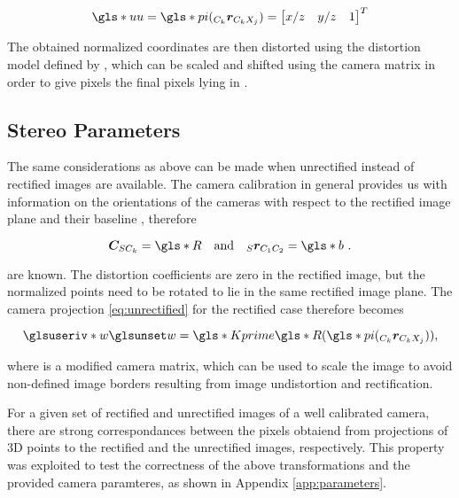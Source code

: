 \begin{equation}
  \g{uu} = \g{pi}(\crcx) = \rowvector{x/z & y/z & 1}^T
\end{equation}

The obtained normalized coordinates  are then distorted using the distortion model  defined by
\cite{radtan}, which can be scaled and shifted using the camera matrix  in order to
give pixels the final pixels  lying in .

\subsection{Stereo Parameters}

The same considerations as above can be made when unrectified instead of
rectified images are available. The camera calibration in general provides us
with information on the orientations of the cameras with respect to the
rectified image plane  and their baseline  \cite{DocCameraInfo}
\cite[p.  523f]{Siciliano2007}, therefore

\begin{equation}
  \rotsc = \g{R} \hspace{1em} \text{and} \hspace{1em} \srcc = \g{b} \text{ .}
  \label{rect/eqn:assumptions}
\end{equation}

are known. The distortion coefficients  are zero in the rectified image,
but the normalized
points need to be rotated to lie in the same rectified image plane. The camera projection
\ref{eq:unrectified} for the rectified case therefore becomes

\begin{equation*}
  \giv{w} = \g{Kprime}\g{R}(\g{pi}(\crcx)) \text{,}
\end{equation*}

where  is a modified camera matrix, which can be used to scale the
image to avoid non-defined
image borders resulting from image undistortion and rectification. 

For a given set of rectified and unrectified images of a well calibrated camera,
there are strong correspondances between the pixels obtaiend from projections of
3D points to the rectified and the unrectified images, respectively. This
property was exploited to test the correctness of the above transformations 
and the provided camera paramteres, as shown in Appendix \ref{app:parameters}.


